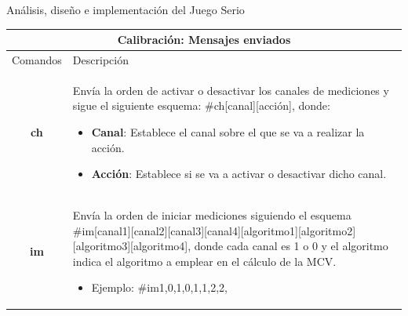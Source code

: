 \begin{thesischapter}{2} {Análisis, diseño e implementación del Juego Serio}
\newpage
\vspace*{60pt}
\begin{table}[h]
    \centering
    \begin{tabular}{ |c|p{14cm}|}
        \hline
        \multicolumn{2}{|c|}{Calibración: Mensajes enviados} \\
        \hline
        Comandos        &   Descripción \\\hline
        \textbf{ch}     &   \begin{minipage}{14cm}
                                \vspace{1pt}
                                Envía la orden de activar o desactivar los canales de mediciones y sigue 
                                el siguiente esquema: \#ch[canal][acción], donde:
                                \begin{itemize}
                                    \item \textbf{Canal}: Establece el canal sobre el que se va a realizar la acción.
                                    \item \textbf{Acción}: Establece si se va a activar o desactivar dicho canal. 
                                \end{itemize}
                                \vspace{1pt}
                            \end{minipage}\\\hline
        \textbf{im}     &   \begin{minipage}{14cm}
                                \vspace{1pt}
                                Envía la orden de iniciar mediciones siguiendo el esquema 
                                \#im[canal1][canal2][canal3][canal4][algoritmo1][algoritmo2][algoritmo3][algoritmo4], donde cada canal es 1 o 0 y el algoritmo indica el algoritmo a emplear en el cálculo de la MCV.
                                \begin{itemize}
                                    \item Ejemplo: \#im1,0,1,0,1,1,2,2,
                                \end{itemize}   
                                \vspace{1pt}

\end{minipage}
\end{tabular}
\end{table}
\end{thesischapter}
